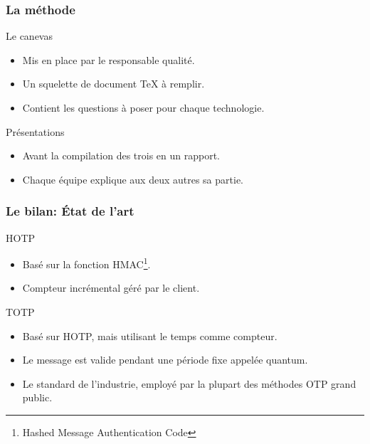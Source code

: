 \documentclass[xcolor=table]{beamer}
\begin{document}
\begin{frame}
\frametitle{La méthode}
\begin{block}{Le canevas}
\begin{itemize}
\item Mis en place par le responsable qualité.
\item Un squelette de document TeX à remplir.
\item Contient les questions à poser pour chaque technologie.
\end{itemize}
\end{block}
\begin{block}{Présentations}
\begin{itemize}
\item Avant la compilation des trois en un rapport.
\item Chaque équipe explique aux deux autres sa partie.
\end{itemize}
\end{block}
\end{frame}

\begin{frame}
\frametitle{Le bilan: État de l'art}
\begin{block}{HOTP}
\begin{itemize}
\item Basé sur la fonction HMAC\footnote{Hashed Message Authentication Code}.
\item Compteur incrémental géré par le client.
\end{itemize}
\end{block}

\begin{block}{TOTP}
\begin{itemize}
\item Basé sur HOTP, mais utilisant le temps comme compteur.
\item Le message est valide pendant une période fixe appelée quantum.
\item Le standard de l'industrie, employé par la plupart des méthodes OTP grand public.
\end{itemize}

\end{block}
\end{frame}
\end{document}

